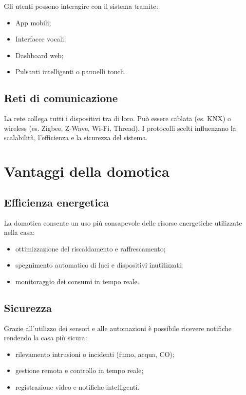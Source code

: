 Gli utenti possono interagire con il sistema tramite:

\begin{itemize}
    \item App mobili;
    \item Interfacce vocali;
    \item Dashboard web;
    \item Pulsanti intelligenti o pannelli touch.
\end{itemize}

\subsection{Reti di comunicazione}

La rete collega tutti i dispositivi tra di loro. Può essere cablata (es. KNX) o wireless (es. Zigbee, Z-Wave, Wi-Fi, Thread). I protocolli scelti influenzano la scalabilità, l’efficienza e la sicurezza del sistema.

\section{Vantaggi della domotica}

\subsection{Efficienza energetica}

La domotica consente un uso più consapevole delle risorse energetiche utilizzate nella casa:

\begin{itemize}
    \item ottimizzazione del riscaldamento e raffrescamento;
    \item spegnimento automatico di luci e dispositivi inutilizzati;
    \item monitoraggio dei consumi in tempo reale.
\end{itemize}

\subsection{Sicurezza}

Grazie all'utilizzo dei sensori e alle automazioni è possibile ricevere notifiche rendendo la casa più sicura:

\begin{itemize}
    \item rilevamento intrusioni o incidenti (fumo, acqua, CO);
    \item gestione remota e controllo in tempo reale;
    \item registrazione video e notifiche intelligenti.
\end{itemize}

